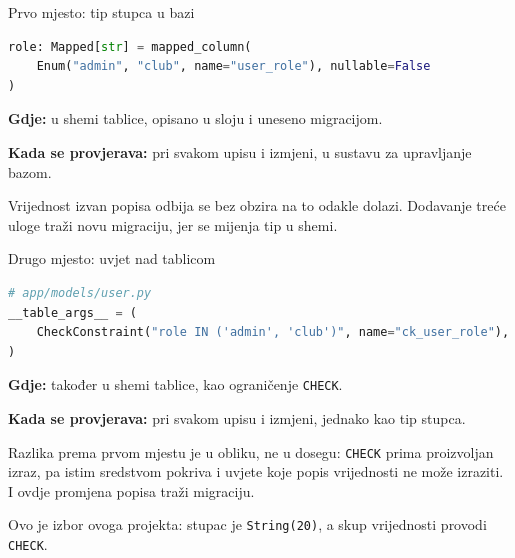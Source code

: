 \begin{frame}[fragile]{Prvo mjesto: tip stupca u bazi}
\begin{lstlisting}[language=python]
role: Mapped[str] = mapped_column(
    Enum("admin", "club", name="user_role"), nullable=False
)
\end{lstlisting}

\vspace{0.4em}
\textbf{Gdje:} u shemi tablice, opisano u sloju  i uneseno migracijom.

\vspace{0.2em}
\textbf{Kada se provjerava:} pri svakom upisu i izmjeni, u sustavu za upravljanje bazom.

\vspace{0.4em}
Vrijednost izvan popisa odbija se bez obzira na to odakle dolazi. Dodavanje treće uloge traži novu migraciju, jer se mijenja tip u shemi.
\end{frame}

\begin{frame}[fragile]{Drugo mjesto: uvjet nad tablicom}
\begin{lstlisting}[language=python]
# app/models/user.py
__table_args__ = (
    CheckConstraint("role IN ('admin', 'club')", name="ck_user_role"),
)
\end{lstlisting}

\vspace{0.4em}
\textbf{Gdje:} također u shemi tablice, kao ograničenje \texttt{CHECK}.

\vspace{0.2em}
\textbf{Kada se provjerava:} pri svakom upisu i izmjeni, jednako kao tip stupca.

\vspace{0.4em}
Razlika prema prvom mjestu je u obliku, ne u dosegu: \texttt{CHECK} prima proizvoljan izraz, pa istim sredstvom pokriva i uvjete koje popis vrijednosti ne može izraziti. I ovdje promjena popisa traži migraciju.

\vspace{0.3em}
Ovo je izbor ovoga projekta: stupac je \texttt{String(20)}, a skup vrijednosti provodi \texttt{CHECK}.
\end{frame}

